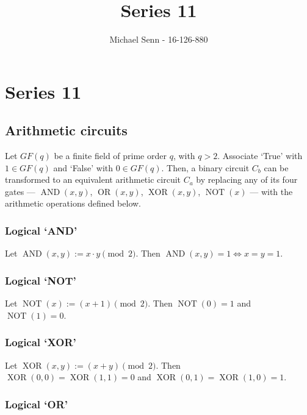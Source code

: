 \documentclass[a4paper]{scrreprt}
\title{Series 11}
\author{Michael Senn \maillink{michael.senn@students.unibe.ch} - 16-126-880}
\date{\printdate}
\begin{document}
\maketitle


\setcounter{chapter}{10}

\chapter{Series 11}

\section{Arithmetic circuits}

Let $GF(q)$ be a finite field of prime order $q$, with $q > 2$. Associate
`True' with $1 \in GF(q)$ and `False' with $0 \in GF(q)$. Then, a binary
circuit $C_b$ can be transformed to an equivalent arithmetic circuit $C_a$ by
replacing any of its four gates --- $\operatorname{AND}(x, y)$,
$\operatorname{OR}(x, y)$, $\operatorname{XOR}(x, y)$, $\operatorname{NOT}(x)$
--- with the arithmetic operations defined below.

\subsection{Logical `AND'}

Let $\operatorname{AND}(x, y) := x \cdot y \pmod{2}$. Then
$\operatorname{AND}(x, y) = 1 \Leftrightarrow x = y = 1$.

\subsection{Logical `NOT'}

Let $\operatorname{NOT}(x) := (x + 1) \pmod{2}$. Then $\operatorname{NOT}(0) =
1$ and $\operatorname{NOT}(1) = 0$.

\subsection{Logical `XOR'}

Let $\operatorname{XOR}(x, y) := (x + y) \pmod{2}$. Then $\operatorname{XOR}(0,
0) = \operatorname{XOR}(1, 1) = 0$ and $\operatorname{XOR}(0, 1) =
\operatorname{XOR}(1, 0) = 1$.

\subsection{Logical `OR'}
\end{document}
